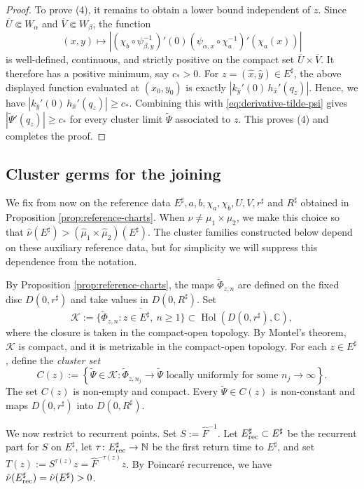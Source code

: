 \documentclass[11pt]{amsart}
\numberwithin{equation}{section}
\theoremstyle{plain}
\theoremstyle{definition}
\theoremstyle{remark}
\begin{document}
\begin{proof}
To prove (4), it remains to obtain a lower bound independent of $z$. Since
$\overline U\Subset W_\alpha$ and
$\overline V\Subset W_\beta$, the function
$$(x,y)\mapsto
\left|
(\chi_b\circ\psi_{\beta,y}^{-1})'(0)
(\psi_{\alpha,x}\circ\chi_a^{-1})'(\chi_a(x))
\right|$$
is well-defined, continuous, and strictly positive on the compact set
$\overline U\times\overline V$. It therefore has a positive minimum,
say $c_*>0$.
For $z=(\hat x,\hat y)\in E^\sharp$, the above displayed function evaluated
at $(x_0,y_0)$ is exactly
$|
k_{\hat y}'(0)\,
h_{\hat x}'(q_z)|.
$
Hence, we have
$|
k_{\hat y}'(0)\,
h_{\hat x}'(q_z)|
\geq c_*$.
Combining this with
\eqref{eq:derivative-tilde-psi}
gives
$|\widetilde\Psi'(q_z)|\geq c_*$ for every cluster limit
$\widetilde\Psi$ associated to $z$. This proves (4) and completes the proof.
\end{proof}


\subsection{Cluster germs for the joining}
\label{subsec:cluster-germs}
We fix from now on the reference data
$E^\sharp,a,b, \chi_a, \chi_b, U,V,r^\sharp$ and $R^\sharp$ obtained in
Proposition \ref{prop:reference-charts}. When $\nu\neq\mu_1\times\mu_2$, we make this choice
so that
$\hat\nu(E^\sharp)>
(\hat\mu_1\times\hat\mu_2)(E^\sharp)$.
The cluster families constructed below depend on these auxiliary
reference data, but for simplicity we will suppress this dependence from the notation.

By Proposition \ref{prop:reference-charts}, the maps
$\widetilde\Phi_{z,n}$ are defined on the fixed disc
$D(0,r^\sharp)$ and take values in $D(0,R^\sharp)$.
Set
$$
\mathcal K
:=
\overline{
\{
\widetilde\Phi_{z,n}:
z\in E^\sharp,\ n\geq1
\}
}
\subset
\operatorname{Hol}(D(0,r^\sharp),\mathbb C),
$$
where the closure is taken in the compact-open topology.
By Montel's theorem, $\mathcal K$ is compact, 
and it is metrizable
in the compact-open topology.
For each $z\in E^\sharp$, define the \emph{cluster set}
$$
C(z)
:=
\left\{
\widetilde\Psi\in\mathcal K:
\widetilde\Phi_{z,n_j}
\to
\widetilde\Psi
\text{ locally uniformly for some }n_j\to\infty
\right\}.
$$
The set $C(z)$ is non-empty and compact. Every
$\widetilde\Psi\in C(z)$ is non-constant and maps
$D(0,r^\sharp)$ into $D(0,R^\sharp)$.

We now restrict to recurrent points. Set $S:=\hat F^{-1}$.
Let $E^\sharp_{\rm rec}\subset E^\sharp$ be the recurrent part for
$S$ on $E^\sharp$, let
$\tau \colon E^\sharp_{\rm rec}\to\mathbb N$ be the first return time to
$E^\sharp$, and set
$T(z):=S^{\tau(z)}z=\hat F^{-\tau(z)}z$.
By Poincaré recurrence, we have
$\hat\nu(E^\sharp_{\rm rec})
=
\hat\nu(E^\sharp)>0$.
\end{document}
